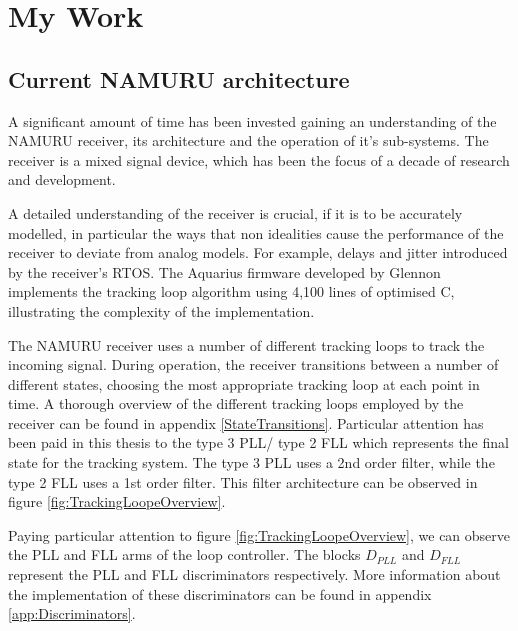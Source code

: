 \chapter{My Work}\label{ch:MyWork}

\section{Current \ac{NAMURU} architecture}
A significant amount of time has been invested gaining an understanding of the \ac{NAMURU} receiver, its architecture and the operation of it's sub-systems. The receiver is a mixed signal device, which has been the focus of a decade of research and development. 

A detailed understanding of the receiver is crucial, if it is to be accurately modelled, in particular the ways that non idealities cause the performance of the receiver to deviate from analog models. For example, delays and jitter introduced  by the receiver's \ac{RTOS}. The Aquarius firmware developed by Glennon \cite{Glennon11aquariusfirmware} implements the tracking loop algorithm using 4,100 lines of optimised C, illustrating the complexity of the implementation.


The \ac{NAMURU} receiver uses a number of different tracking loops to track the incoming signal. During operation, the receiver transitions between a number of different states, choosing the most appropriate tracking loop at each point in time. A thorough overview of the different tracking loops employed by the receiver can be found in appendix \ref{StateTransitions}. Particular attention has been paid in this thesis to the type 3 PLL/ type 2 FLL which represents the final state for the tracking system. The type 3 PLL uses a 2nd order filter, while the type 2 FLL uses a 1st order filter. This filter architecture can be observed in figure \ref{fig:TrackingLoopeOverview}. 



Paying particular attention to figure \ref{fig:TrackingLoopeOverview}, we can observe the PLL and FLL arms of the loop controller. The blocks $D_{PLL}$ and $D_{FLL}$ represent the PLL and FLL discriminators respectively. More information about the implementation of these discriminators can be found in appendix \ref{app:Discriminators}. 






